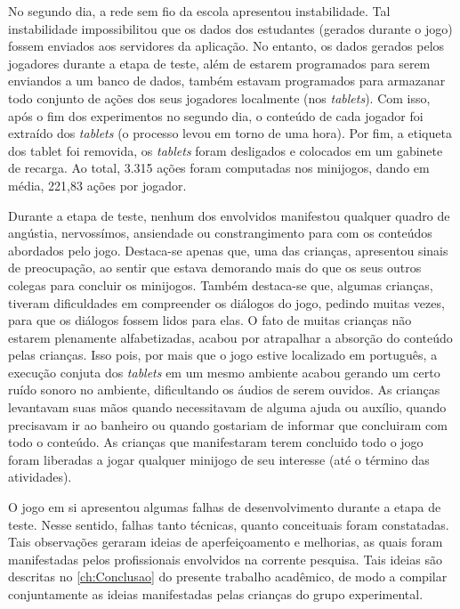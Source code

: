 No segundo dia, a rede sem fio da escola apresentou instabilidade. Tal instabilidade impossibilitou que os dados dos estudantes (gerados durante o jogo) fossem enviados aos servidores da aplicação. No entanto, os dados gerados pelos jogadores durante a etapa de teste, além de estarem programados para serem enviandos a um banco de dados, também estavam programados para armazanar todo conjunto de ações dos seus jogadores localmente (nos \textit{tablets}). Com isso, após o fim dos experimentos no segundo dia, o conteúdo de cada jogador foi extraído dos \textit{tablets} (o processo levou em torno de uma hora). Por fim, a etiqueta dos tablet foi removida, os \textit{tablets} foram desligados e colocados em um gabinete de recarga. Ao total, 3.315 ações foram computadas nos minijogos, dando em média, 221,83 ações por jogador.

Durante a etapa de teste, nenhum dos envolvidos manifestou qualquer quadro de angústia, nervossímos, ansiendade ou constrangimento para com os conteúdos abordados pelo jogo. Destaca-se apenas que, uma das crianças, apresentou sinais de preocupação, ao sentir que estava demorando mais do que os seus outros colegas para concluir os minijogos. Também destaca-se que, algumas crianças, tiveram dificuldades em compreender os diálogos do jogo, pedindo muitas vezes, para que os diálogos fossem lidos para elas. O fato de muitas crianças não estarem plenamente alfabetizadas, acabou por atrapalhar a absorção do conteúdo pelas crianças. Isso pois, por mais que o jogo estive localizado em português, a execução conjuta dos \textit{tablets} em um mesmo ambiente acabou gerando um certo ruído sonoro no ambiente, dificultando os áudios de serem ouvidos. As crianças levantavam suas mãos quando necessitavam de alguma ajuda ou auxílio, quando precisavam ir ao banheiro ou quando gostariam de informar que concluiram com todo o conteúdo. As crianças que manifestaram terem concluido todo o jogo foram liberadas a jogar qualquer minijogo de seu interesse (até o término das atividades). 

O jogo em si apresentou algumas falhas de desenvolvimento durante a etapa de teste. Nesse sentido, falhas tanto técnicas, quanto conceituais foram constatadas. Tais observações geraram ideias de aperfeiçoamento e melhorias, as quais foram manifestadas pelos profissionais envolvidos na corrente pesquisa. Tais ideias são descritas no \autoref{ch:Conclusao} do presente trabalho acadêmico, de modo a compilar conjuntamente as ideias manifestadas pelas crianças do grupo experimental. 


